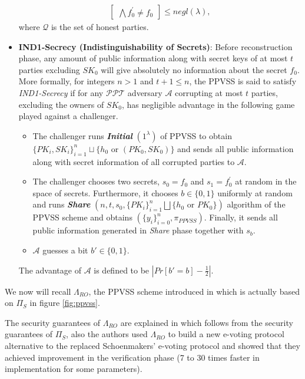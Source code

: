 \begin{itemize}
\begin{align*}
\begin{bmatrix}
            \bigwedge f_0^{'}\neq f_0
          \end{bmatrix} \leq negl(\lambda),
        \end{align*}
        where $\mathcal{Q}$ is the set of honest parties.
  \item \textbf{IND1-Secrecy (Indistinguishability of Secrets)}: Before reconstruction phase, any amount of public 
    information along with secret keys of at most $t$ parties excluding $SK_0$ will give 
    absolutely no information about the secret $f_0$. More formally, for integers $n>1$ and 
    $t+1\leq n$, the PPVSS is said to satisfy \textit{IND1-Secrecy} if for any $\mathcal{PPT}$ adversary $\mathcal{A}$ 
    corrupting at most $t$ parties, excluding the owners of $SK_0$, has negligible 
    advantage in the following game played against a challenger.
    \begin{itemize}
      \item The challenger runs \textit{\textbf{Initial}} $(1^\lambda)$ of PPVSS to obtain 
        $\{PK_i,SK_i\}_{i=1}^n\sqcup\{h_0\text{ or }(PK_0,SK_0)\}$ and sends all public 
        information along with secret information of all corrupted parties to $\mathcal{A}$.
      \item The challenger chooses two secrets, $s_0=f_0$ and 
        $s_1=f_0^{'}$ at random in the space of secrets. Furthermore, it chooses $b\in\{0,1\}$ 
        uniformly at random and runs 
        \textit{\textbf{Share}} $(n,t,s_0,\{PK_i\}_{i=1}^n\bigsqcup\{h_0\text{ or }PK_0\})$ 
        algorithm of the PPVSS scheme and obtains $(\{y_i\}_{i=0}^n,\pi_{PPVSS})$. Finally, it 
        sends all public information generated in \textit{Share} phase together with $s_b$.
      \item $\mathcal{A}$ guesses a bit $b'\in\{0,1\}$.
    \end{itemize}
    The advantage of $\mathcal{A}$ is defined to be $|Pr[b'=b]-\frac{1}{2}|$.
\end{itemize}

We now will recall 
$\Lambda_{RO}$, the PPVSS scheme introduced in \cite{cryptoeprint:2025/576} which is actually based on 
$\Pi_S$ \cite{cryptoeprint:2023/1669} in figure \ref{fig:ppvss}.\par 

The security guarantees of $\Lambda_{RO}$ are explained in \cite{cryptoeprint:2025/576} which follows from 
the security guarantees of $\Pi_S$, also the authors used $\Lambda_{RO}$ to build a new e-voting 
protocol alternative to the replaced Schoenmakers' e-voting protocol \cite{5581ccd9530540479539d21d1d39ae96} 
and showed that they achieved improvement in the verification phase 
(7 to 30 times faster in implementation for some parameters). 


